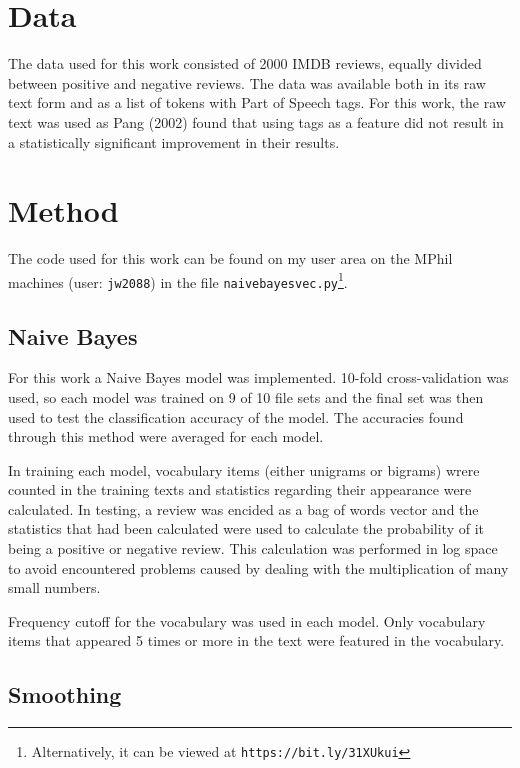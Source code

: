 \documentclass[twocolumn]{article}
\begin{document}
\section{Data}

The data used for this work consisted of 2000 IMDB reviews, equally divided between positive and negative reviews. The data was available both in its raw text form and as a list of tokens with Part of Speech tags. For this work, the raw text was used as Pang (2002) found that using tags as a feature did not result in a statistically significant improvement in their results. 


\section{Method}


The code used for this work can be found on my user area on the MPhil machines (user: \texttt{jw2088}) in the file \texttt{naivebayesvec.py}\footnote{Alternatively, it can be viewed at \texttt{https://bit.ly/31XUkui}}.

\subsection{Naive Bayes}

For this work a Naive Bayes model was implemented. 10-fold cross-validation was used, so each model was trained on 9 of 10 file sets and the final set was then used to test the classification accuracy of the model. The accuracies found through this method were averaged for each model. 

In training each model, vocabulary items (either unigrams or bigrams) wrere counted in the training texts and statistics regarding their appearance were calculated. In testing, a review was encided as a bag of words vector and the statistics that had been calculated were used to calculate the probability of it being a positive or negative review. This calculation was performed in log space to avoid encountered problems caused by dealing with the multiplication of many small numbers.

Frequency cutoff for the vocabulary was used in each model. Only vocabulary items that appeared 5 times or more in the text were featured in the vocabulary.

\subsection{Smoothing}
\end{document}
